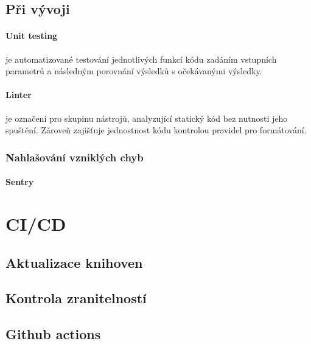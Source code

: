 \documentclass[12pt, a4paper,
 twoside,        %
 openright
]{report}
\begin{document}
\subsection{Při vývoji}  
\paragraph{Unit testing} je automatizované testování jednotlivých funkcí kódu zadáním vstupních parametrů a následným porovnání výsledků s očekávanými výsledky.
\paragraph{Linter} je označení pro skupinu nástrojů, analyzující statický kód bez nutnosti jeho spuštění. Zároveň zajišťuje jednostnost kódu kontrolou pravidel pro formátování. 
\subsubsection{Nahlašování vzniklých chyb}
\paragraph{Sentry}


 

\section{CI/CD}
\subsection{Aktualizace knihoven}
\subsection{Kontrola zranitelností}
\subsection{Github actions} 


\listoffigures

 
\end{document}
